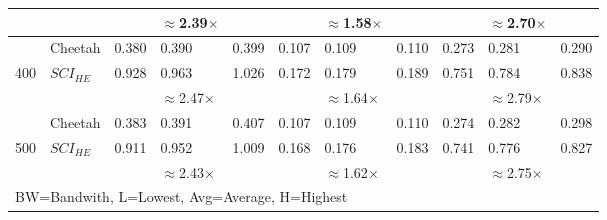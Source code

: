 \begin{tabular}{lllllllllll}
           &         &        & $\approx$2.39$\times$    &       &               & $\approx$1.58$\times$           &               &               & $\approx$2.70$\times$           &               \\ \hline
           & Cheetah & 0.380  & 0.390    & 0.399 & 0.107         & 0.109           & 0.110         & 0.273         & 0.281           & 0.290         \\
400        & $SCI_{HE}$ & 0.928  & 0.963    & 1.026 & 0.172         & 0.179           & 0.189         & 0.751         & 0.784           & 0.838         \\ \cline{3-11} 
           &         &        & $\approx$2.47$\times$    &       &               & $\approx$1.64$\times$           &               &               & $\approx$2.79$\times$           &               \\ \hline
           & Cheetah & 0.383  & 0.391    & 0.407 & 0.107         & 0.109           & 0.110         & 0.274         & 0.282           & 0.298         \\
500        & $SCI_{HE}$ & 0.911  & 0.952    & 1.009 & 0.168         & 0.176           & 0.183         & 0.741         & 0.776           & 0.827         \\ \cline{2-11} 
           &         &        & $\approx$2.43$\times$    &       &               & $\approx$1.62$\times$           &               &               & $\approx$2.75$\times$           &               \\ \hline
\multicolumn{11}{l}{BW=Bandwith, L=Lowest, Avg=Average, H=Highest}                                                                                  
\end{tabular}